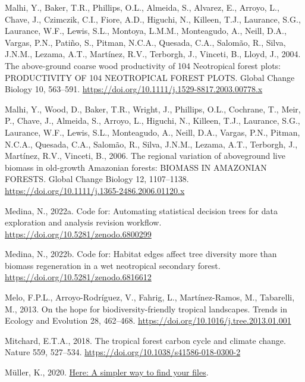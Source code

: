 \documentclass[
  12pt,
]{article}
\newlength{\cslhangindent}
\newlength{\cslentryspacingunit} %
\newenvironment{CSLReferences}[2] %
 {%
  \setlength{\parindent}{0pt}
  \ifodd #1
  \let\oldpar\par
  \def\par{\hangindent=\cslhangindent\oldpar}
  \fi
  \setlength{\parskip}{#2\cslentryspacingunit}
 }%
 {}
\begin{document}
\begin{CSLReferences}{1}{0}
\leavevmode{}%
Malhi, Y., Baker, T.R., Phillips, O.L., Almeida, S., Alvarez, E., Arroyo, L., Chave, J., Czimczik, C.I., Fiore, A.D., Higuchi, N., Killeen, T.J., Laurance, S.G., Laurance, W.F., Lewis, S.L., Montoya, L.M.M., Monteagudo, A., Neill, D.A., Vargas, P.N., Patiño, S., Pitman, N.C.A., Quesada, C.A., Salomão, R., Silva, J.N.M., Lezama, A.T., Martínez, R.V., Terborgh, J., Vinceti, B., Lloyd, J., 2004. The above-ground coarse wood productivity of 104 {Neotropical} forest plots: {PRODUCTIVITY OF} 104 {NEOTROPICAL FOREST PLOTS}. Global Change Biology 10, 563--591. \url{https://doi.org/10.1111/j.1529-8817.2003.00778.x}

\leavevmode{}%
Malhi, Y., Wood, D., Baker, T.R., Wright, J., Phillips, O.L., Cochrane, T., Meir, P., Chave, J., Almeida, S., Arroyo, L., Higuchi, N., Killeen, T.J., Laurance, S.G., Laurance, W.F., Lewis, S.L., Monteagudo, A., Neill, D.A., Vargas, P.N., Pitman, N.C.A., Quesada, C.A., Salomão, R., Silva, J.N.M., Lezama, A.T., Terborgh, J., Martínez, R.V., Vinceti, B., 2006. The regional variation of aboveground live biomass in old-growth {Amazonian} forests: {BIOMASS IN AMAZONIAN FORESTS}. Global Change Biology 12, 1107--1138. \url{https://doi.org/10.1111/j.1365-2486.2006.01120.x}

\leavevmode{}%
Medina, N., 2022a. {Code for: Automating statistical decision trees for data exploration and analysis revision workflow}. \url{https://doi.org/10.5281/zenodo.6800299}

\leavevmode{}%
Medina, N., 2022b. {Code for: Habitat edges affect tree diversity more than biomass regeneration in a wet neotropical secondary forest}. \url{https://doi.org/10.5281/zenodo.6816612}

\leavevmode{}%
Melo, F.P.L., Arroyo-Rodríguez, V., Fahrig, L., Martínez-Ramos, M., Tabarelli, M., 2013. On the hope for biodiversity-friendly tropical landscapes. Trends in Ecology and Evolution 28, 462--468. \url{https://doi.org/10.1016/j.tree.2013.01.001}

\leavevmode{}%
Mitchard, E.T.A., 2018. The tropical forest carbon cycle and climate change. Nature 559, 527--534. \url{https://doi.org/10.1038/s41586-018-0300-2}

\leavevmode{}%
Müller, K., 2020. \href{https://CRAN.R-project.org/package=here}{Here: A simpler way to find your files}.


\end{CSLReferences}
\end{document}
